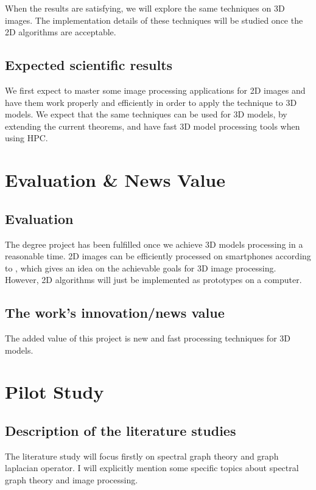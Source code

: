 \documentclass[12pt]{article}
\begin{document}
When the results are satisfying, we will explore the same techniques on 3D images.
The implementation details of these techniques will be studied once the 2D algorithms are acceptable.

\subsection*{Expected scientific results}

We first expect to master some image processing applications for 2D images and have them work properly and efficiently in order to apply the technique to 3D models.
We expect that the same techniques can be used for 3D models, by extending the current theorems, and have fast 3D model processing tools when using HPC.

\section*{Evaluation \& News Value}

\subsection*{Evaluation}

The degree project has been fulfilled once we achieve 3D models processing in a reasonable time.
2D images can be efficiently processed on smartphones according to \cite{siam_slides_2016} \cite{glide_2014}, which gives an idea on the achievable goals for 3D image processing.
However, 2D algorithms will just be implemented as prototypes on a computer.

\subsection*{The work's innovation/news value}

The added value of this project is new and fast processing techniques for 3D models.

\section*{Pilot Study}

\subsection*{Description of the literature studies}

The literature study will focus firstly on spectral graph theory and graph laplacian operator.
I will explicitly mention some specific topics about spectral graph theory and image processing.
\end{document}
